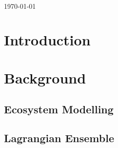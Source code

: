\documentclass[10pt, a4paper]{report}
\begin{document}
\begin{titlepage}


{\large \today}\\[3cm] %




\vfill %
\end{titlepage}


\tableofcontents




\chapter{Introduction}\label{ch:intro}


\chapter{Background}\label{ch:bkg}

\section{Ecosystem Modelling}\label{sec:ecomodel}
\cite{Woods2005}

\section{Lagrangian Ensemble}\label{sec:le}
\end{document}
